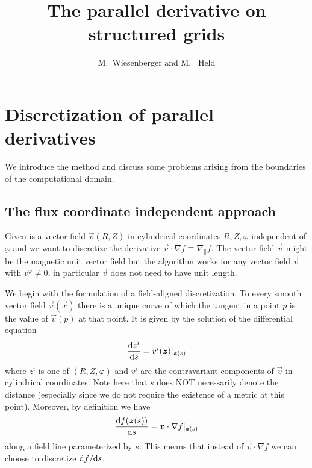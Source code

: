 






\title{The parallel derivative on structured grids}
\author{M.~Wiesenberger and M.~ Held}

\maketitle

\section{Discretization of parallel derivatives} \label{sec:parallel}
We introduce the method
and discuss some problems arising from the boundaries of the computational domain.

\subsection{The flux coordinate independent approach} \label{sec:parallela}
Given is a vector field $\vec v(R,Z)$ in cylindrical coordinates $R,Z,\varphi$ independent of $\varphi$ and we want to
discretize the derivative $\vec v \cdot\nabla f \equiv \nabla_\parallel f$.
The vector field $\vec v$ might be the magnetic unit vector field but the algorithm works
for any vector field $\vec v$ with $v^\varphi\neq 0$, in particular $\vec v$ does not need
to have unit length.

We begin with the formulation of a field-aligned discretization.
To every smooth vector field $\vec v(\vec x)$ there is a unique curve of which the
tangent in a point $p$ is the value of $\vec v(p)$ at that point. It is given by
the solution of the differential equation
\begin{align}
  \frac{\mathrm{d} z^i}{\mathrm{d} s} = v^i({\boldsymbol{z}})|_{{\boldsymbol{z}}(s)}
    \label{eq:integralcurve}
\end{align}
where $z^i$ is one of $(R, Z, \varphi)$ and $v^i$ are the contravariant components
of $\vec v$ in cylindrical coordinates.
Note here that $s$ does NOT necessarily denote the distance
(especially since we do not require the existence of a metric at this point).
Moreover, by definition we have
\begin{align}
    \frac{\mathrm{d} f({\boldsymbol{z}}(s))}{\mathrm{d} s} = {\boldsymbol{v}}\cdot \nabla f|_{{\boldsymbol{z}}(s)}
    \label{}
\end{align}
along a field line parameterized by $s$.
This means that instead of $\vec v \cdot \nabla f$ we can choose to discretize ${\mathrm{d} f}/{\mathrm{d} s}$.


